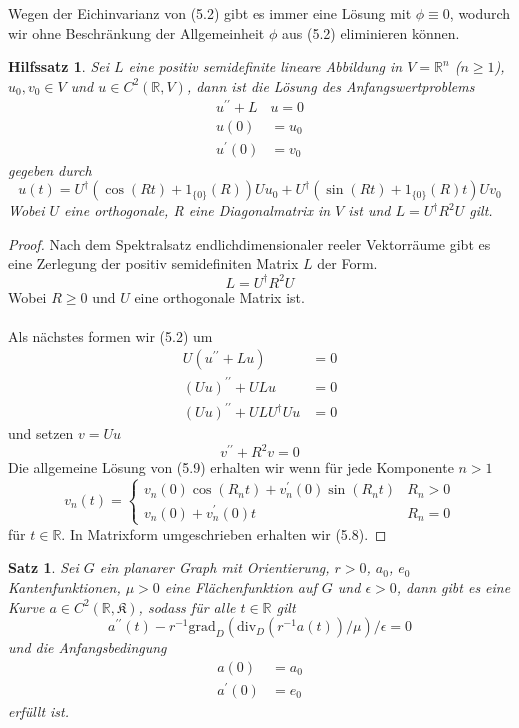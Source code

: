 \documentclass[11pt,a4paper,leqno]{report}
\newtheorem{proposition}{Satz}[chapter]
\newtheorem{lemma}[theorem]{Hilfssatz}
\numberwithin{equation}{chapter}
\begin{document}
Wegen der Eichinvarianz von (5.2) gibt es immer eine L\"osung mit $\phi\equiv0$, wodurch wir ohne Beschr\"ankung der Allgemeinheit $\phi$ aus (5.2) eliminieren k\"onnen.
\begin{lemma}
	Sei $L$ eine positiv semidefinite lineare Abbildung in $V=\mathbb{R}^n$ ($n\geq 1 $), $u_0, v_0 \in V$ und $u\in C^2(\mathbb{R}, V)$, dann ist die L\"osung des Anfangswertproblems
	\begin{align}
		u^{\prime \prime} + L&u = 0\\
		u(0) &= u_0\\
		u^\prime(0)&=v_0
	\end{align}
	gegeben durch
	\begin{equation}
		u(t) = U^\dagger (\cos(Rt) + 1_{\{0\}}(R))Uu_0 +U^\dagger (\sin(Rt) + 1_{\{0\}}(R)t)Uv_0
	\end{equation}
	Wobei $U$ eine orthogonale, R eine Diagonalmatrix in $V$ ist und $L=U^\dagger R^2 U$ gilt.
\end{lemma}
\begin{proof}
	Nach dem Spektralsatz endlichdimensionaler reeler Vektorr\"aume gibt es eine Zerlegung der positiv semidefiniten Matrix $L$ der Form.
	\begin{equation*}
		L=U^\dagger R^2 U
	\end{equation*}
	Wobei $R\geq 0$ und $U$ eine orthogonale Matrix ist.
	\\
	\\
	Als n\"achstes formen wir (5.2) um
	\begin{align*}
		U(u^{\prime \prime} + Lu )&= 0\\
		(Uu)^{\prime \prime} + ULu &= 0\\
		(Uu)^{\prime \prime} + ULU^\dagger Uu &= 0
	\end{align*}
 und setzen $v=Uu$
 \begin{equation}
	v^{\prime \prime} + R^2v=0
 \end{equation}
Die allgemeine L\"osung von (5.9) erhalten wir wenn f\"ur jede Komponente $n>1$
\begin{equation*}
	v_n(t) = 
	\begin{cases} 
		v_n(0)\cos(R_nt) + v_n^\prime(0)\sin(R_nt) & R_n > 0 \\
		v_n(0) + v_n^\prime(0)t & R_n=0 
	\end{cases}	
\end{equation*} 
 f\"ur $t\in\mathbb{R}$. In Matrixform umgeschrieben erhalten wir (5.8).
\end{proof}
\begin{proposition}
Sei $G$ ein planarer Graph mit Orientierung, $r>0$, $a_0$, $e_0$ Kantenfunktionen, $\mu>0$ eine Fl\"achenfunktion auf $G$ und $\epsilon>0$, dann gibt es eine Kurve $a\in C^2(\mathbb{R},\mathfrak{K})$, sodass f\"ur alle $t\in\mathbb{R}$ gilt
\begin{equation}
	a^{\prime\prime}(t)-r^{-1}\text{grad}_D(\text{div}_D(r^{-1}a(t)) / \mu) / \epsilon = 0
\end{equation}
und die Anfangsbedingung
\begin{align}
	a(0)&= a_0\\
	a^\prime(0) &= e_0
\end{align}
erf\"ullt ist.
\end{proposition}
\end{document}
